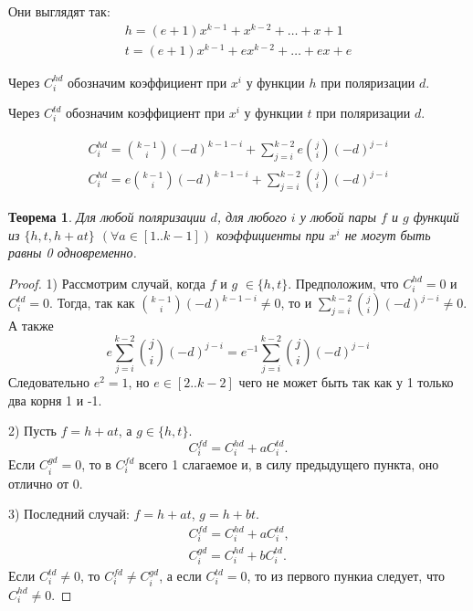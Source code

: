 \documentclass[bibliography=totoc, a4paper, 12pt]{extarticle}
\newtheorem{myth}{Теорема}
\begin{document}
Они выглядят так:
\[
    \begin{array}{l}
        h = (e+1)x^{k-1} + x^{k-2} + \dots + x + 1\\
        t = (e+1)x^{k-1} + ex^{k-2} + \dots + ex + e
    \end{array}
\]

Через $C_i^{hd}$ обозначим коэффициент при $x^i$ у функции $h$ при поляризации
$d$.

Через $C_i^{td}$ обозначим коэффициент при $x^i$ у функции $t$ при поляризации
$d$.

\[
    \begin{array}{l}
        C_i^{hd} = \binom{k-1}{i} (-d)^{k-1-i} +
            \sum\limits_{j=i}^{k-2} e \binom{j}{i} (-d)^{j-i} \\
        C_i^{hd} = e \binom{k-1}{i} (-d)^{k-1-i} +
            \sum\limits_{j=i}^{k-2} \binom{j}{i} (-d)^{j-i}
    \end{array}
\]

\begin{myth}
    Для любой поляризации $d$, для любого $i$ у любой пары $f$ и $g$ функций из
    $\{h, t, h + at\}$ $(\forall a \in [1..k-1])$ коэффициенты при $x^i$ не
    могут быть равны 0 одновременно.
\end{myth}
\begin{proof}

    1) Рассмотрим случай, когда $f$ и $g$ $\in \{h, t\}$.
    Предположим, что $C_i^{hd} = 0$ и $C_i^{td} = 0$. Тогда, так как
    $\binom{k-1}{i} (-d)^{k-1-i} \neq 0$, то и $\sum\limits_{j=i}^{k-2}
    \binom{j}{i} (-d)^{j-i} \neq 0$. А также
    \[
        e \sum\limits_{j=i}^{k-2} \binom{j}{i} (-d)^{j-i} =
        e^{-1} \sum\limits_{j=i}^{k-2} \binom{j}{i} (-d)^{j-i}
    \]
    Следовательно $e^2 = 1$, но $e \in [2..k-2]$ чего не может быть так как
    у 1 только два корня 1 и -1.

    2) Пусть $f = h + at$, а $g \in \{h, t\}$.
    \[
        C_i^{fd} = C_i^{hd} + aC_i^{td} \text{.}
    \]
    Если $C_i^{gd} = 0$, то в $C_i^{fd}$ всего 1 слагаемое и, в силу
    предыдущего пункта, оно отлично от 0.

    3) Последний случай: $f = h + at$, $g = h + bt$.
    \[
        \begin{array}{l}
            C_i^{fd} = C_i^{hd} + aC_i^{td} \text{,} \\
            C_i^{gd} = C_i^{hd} + bC_i^{td} \text{.}
        \end{array}
    \]
    Если $C_i^{td} \neq 0$, то $C_i^{fd} \neq C_i^{gd}$, а если $C_i^{td} = 0$,
    то из первого пункиа следует, что $C_i^{hd} \neq 0$.

\end{proof}
\end{document}

